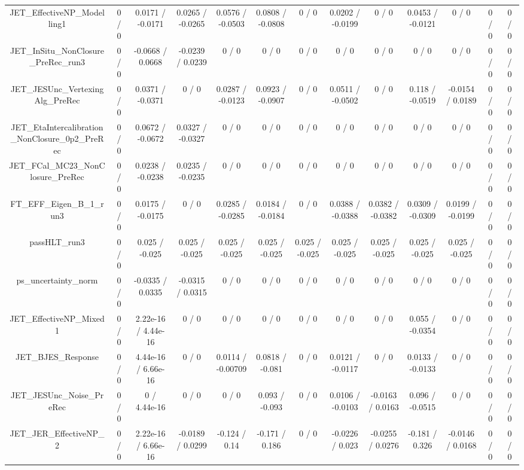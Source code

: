 \documentclass[10pt]{article}
\begin{document}
\begin{table}[htbp]
\begin{center}
\begin{tabular}{|c|c|c|c|c|c|c|c|c|c|c|c|c|}
  JET_EffectiveNP_Modelling1 & 0 / 0 & 0.0171 / -0.0171 & 0.0265 / -0.0265 & 0.0576 / -0.0503 & 0.0808 / -0.0808 & 0 / 0 & 0.0202 / -0.0199 & 0 / 0 & 0.0453 / -0.0121 & 0 / 0 & 0 / 0 & 0 / 0 \\ 
  JET_InSitu_NonClosure_PreRec_run3 & 0 / 0 & -0.0668 / 0.0668 & -0.0239 / 0.0239 & 0 / 0 & 0 / 0 & 0 / 0 & 0 / 0 & 0 / 0 & 0 / 0 & 0 / 0 & 0 / 0 & 0 / 0 \\ 
  JET_JESUnc_VertexingAlg_PreRec & 0 / 0 & 0.0371 / -0.0371 & 0 / 0 & 0.0287 / -0.0123 & 0.0923 / -0.0907 & 0 / 0 & 0.0511 / -0.0502 & 0 / 0 & 0.118 / -0.0519 & -0.0154 / 0.0189 & 0 / 0 & 0 / 0 \\ 
  JET_EtaIntercalibration_NonClosure_0p2_PreRec & 0 / 0 & 0.0672 / -0.0672 & 0.0327 / -0.0327 & 0 / 0 & 0 / 0 & 0 / 0 & 0 / 0 & 0 / 0 & 0 / 0 & 0 / 0 & 0 / 0 & 0 / 0 \\ 
  JET_FCal_MC23_NonClosure_PreRec & 0 / 0 & 0.0238 / -0.0238 & 0.0235 / -0.0235 & 0 / 0 & 0 / 0 & 0 / 0 & 0 / 0 & 0 / 0 & 0 / 0 & 0 / 0 & 0 / 0 & 0 / 0 \\ 
  FT_EFF_Eigen_B_1_run3 & 0 / 0 & 0.0175 / -0.0175 & 0 / 0 & 0.0285 / -0.0285 & 0.0184 / -0.0184 & 0 / 0 & 0.0388 / -0.0388 & 0.0382 / -0.0382 & 0.0309 / -0.0309 & 0.0199 / -0.0199 & 0 / 0 & 0 / 0 \\ 
  passHLT_run3 & 0 / 0 & 0.025 / -0.025 & 0.025 / -0.025 & 0.025 / -0.025 & 0.025 / -0.025 & 0.025 / -0.025 & 0.025 / -0.025 & 0.025 / -0.025 & 0.025 / -0.025 & 0.025 / -0.025 & 0 / 0 & 0 / 0 \\ 
  ps_uncertainty_norm & 0 / 0 & -0.0335 / 0.0335 & -0.0315 / 0.0315 & 0 / 0 & 0 / 0 & 0 / 0 & 0 / 0 & 0 / 0 & 0 / 0 & 0 / 0 & 0 / 0 & 0 / 0 \\ 
  JET_EffectiveNP_Mixed1 & 0 / 0 & 2.22e-16 / 4.44e-16 & 0 / 0 & 0 / 0 & 0 / 0 & 0 / 0 & 0 / 0 & 0 / 0 & 0.055 / -0.0354 & 0 / 0 & 0 / 0 & 0 / 0 \\ 
  JET_BJES_Response & 0 / 0 & 4.44e-16 / 6.66e-16 & 0 / 0 & 0.0114 / -0.00709 & 0.0818 / -0.081 & 0 / 0 & 0.0121 / -0.0117 & 0 / 0 & 0.0133 / -0.0133 & 0 / 0 & 0 / 0 & 0 / 0 \\ 
  JET_JESUnc_Noise_PreRec & 0 / 0 & 0 / 4.44e-16 & 0 / 0 & 0 / 0 & 0.093 / -0.093 & 0 / 0 & 0.0106 / -0.0103 & -0.0163 / 0.0163 & 0.096 / -0.0515 & 0 / 0 & 0 / 0 & 0 / 0 \\ 
  JET_JER_EffectiveNP_2 & 0 / 0 & 2.22e-16 / 6.66e-16 & -0.0189 / 0.0299 & -0.124 / 0.14 & -0.171 / 0.186 & 0 / 0 & -0.0226 / 0.023 & -0.0255 / 0.0276 & -0.181 / 0.326 & -0.0146 / 0.0168 & 0 / 0 & 0 / 0 \\ 

\end{tabular}
\end{center}
\end{table}
\end{document}
